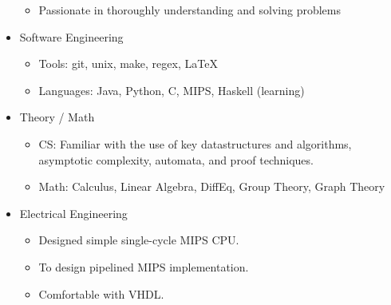 \documentclass[18pt]{article}
\providecommand{\tightlist}{%
    \setlength{\itemsep}{0pt}\setlength{\parskip}{0pt}}
\begin{document}
\begin{multicols}{2}
\begin{itemize}
  \begin{itemize}
  \tightlist
  \item Passionate in thoroughly understanding and solving problems
  \end{itemize}
\item
  Software Engineering

  \begin{itemize}
  \tightlist
  \item
    Tools: git, unix, make, regex, \LaTeX
  \item
    Languages: Java, Python, C, MIPS, Haskell (learning)
  \end{itemize}
\item
  Theory / Math

  \begin{itemize}
  \tightlist
  \item
    CS: Familiar with the use of key datastructures and algorithms, asymptotic complexity, automata, and proof techniques.
  \item
    Math: Calculus, Linear Algebra, DiffEq, Group Theory, Graph Theory
  \end{itemize}
\item
  Electrical Engineering

  \begin{itemize}
  \tightlist
  \item
    Designed simple single-cycle MIPS CPU.
  \item
    To design pipelined MIPS implementation.
  \item
    Comfortable with VHDL.
  \end{itemize}
\end{itemize} 


\end{multicols}
\end{document}
